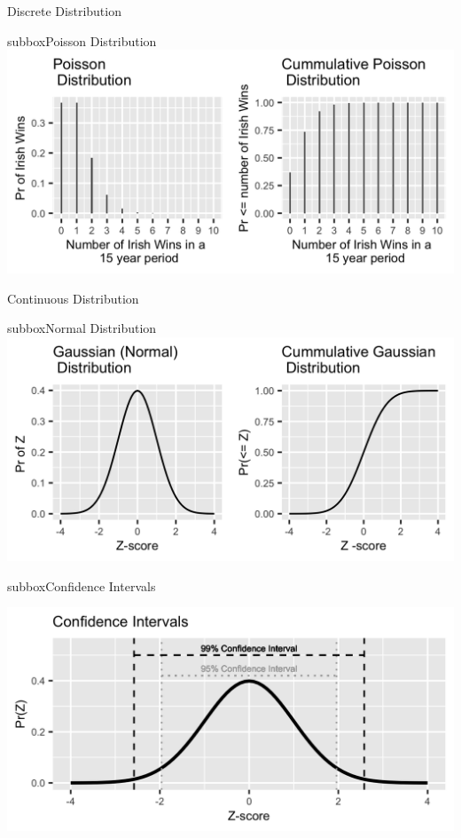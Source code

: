 \documentclass[10pt,a4paper]{article}
\begin{document}
\begin{multicols}{3}
\begin{textbox}{Discrete Distribution}
\begin{subbox}{subbox}{Poisson Distribution}
    \includegraphics[width=\textwidth]{Figures/Distributions/Poisson.png}
\end{subbox}

\end{textbox}
\begin{textbox}{Continuous Distribution}
\begin{subbox}{subbox}{Normal Distribution}
    \includegraphics[width=\textwidth]{Figures/Distributions/Normal.png}
\end{subbox}
\begin{subbox}{subbox}{Confidence Intervals}
\begin{center}
\tiny
    \includegraphics[width=\textwidth]{Figures/Distributions/CI_Normal.png}
\end{center}
\end{subbox}


\end{textbox}
\end{multicols}
\end{document}
